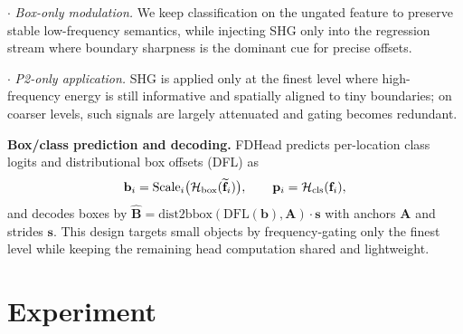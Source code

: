 \documentclass{article}
\theoremstyle{plain}
\theoremstyle{definition}
\theoremstyle{remark}
\begin{document}
\noindent$\cdot$ \emph{Box-only modulation.} We keep classification on the ungated feature to preserve stable low-frequency semantics, while injecting SHG only into the regression stream where boundary sharpness is the dominant cue for precise offsets.

\noindent$\cdot$ \emph{P2-only application.} SHG is applied only at the finest level where high-frequency energy is still informative and spatially aligned to tiny boundaries; on coarser levels, such signals are largely attenuated and gating becomes redundant.
 
 \noindent\textbf{Box/class prediction and decoding.}
 FDHead predicts per-location class logits and distributional box offsets (DFL) as
 \vspace{-0.2cm}
 \begin{equation}
 \label{eq:fdhead_pred}
 \mathbf{b}_i = \mathrm{Scale}_i\bigl(\mathcal{H}_{\mathrm{box}}(\widetilde{\mathbf{f}}_i)\bigr),\qquad
 \mathbf{p}_i = \mathcal{H}_{\mathrm{cls}}(\mathbf{f}_i),
 \vspace{-0.2cm}
 \end{equation}
 and decodes boxes by $\widehat{\mathbf{B}}=\mathrm{dist2bbox}(\mathrm{DFL}(\mathbf{b}),\mathbf{A})\cdot\mathbf{s}$ with anchors $\mathbf{A}$ and strides $\mathbf{s}$. This design targets small objects by frequency-gating only the finest level while keeping the remaining head computation shared and lightweight.

 \section{Experiment}
\end{document}
